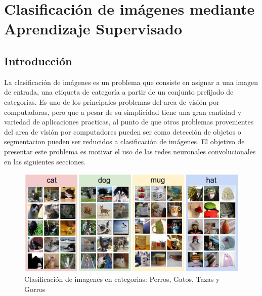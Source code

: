 \documentclass[a4paper,11pt,spanish]{book}
\begin{document}
    
    \section{Clasificación de imágenes mediante Aprendizaje Supervisado}
      \subsection{Introducción}
	La clasificación de imágenes es un problema que consiste en asignar a una imagen de entrada, una etiqueta de categoría a partir de un conjunto prefijado de categorias.
	Es uno de los principales problemas del area de visión por computadoras, pero que a pesar de su simplicidad tiene una gran cantidad y variedad de aplicaciones practicas, 
	al punto de que otros problemas provenientes del area de visión por computadores pueden ser como detección de objetos o segmentacion pueden ser reducidos a clasificación de imágenes.
	El objetivo de presentar este problema es motivar el uso de las redes neuronales convolucionales en las siguientes secciones.
	\begin{figure}[h]
	  \includegraphics[scale=0.5]{./img/stanford_img_class.jpg}
	  \caption{Clasificación de imagenes en categorias: Perros, Gatos, Tazas y Gorros}
	  \label{fig:stanford_img_class}
	\end{figure}
\end{document}

